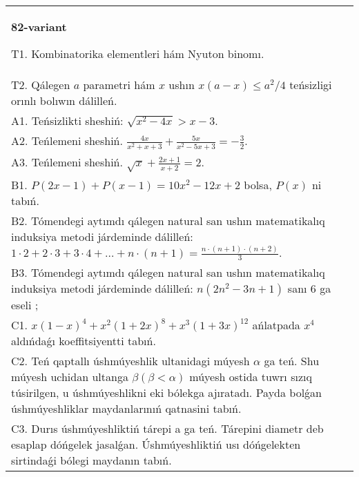 \documentclass{article}
\begin{document}
\begin{tabular}{m{17cm}}
\textbf{82-variant}
\newline

T1. Kombinatorika elementleri hám Nyuton binomı. \\
T2. Qálegen \(a\) parametri hám \(x\) ushın \(x(a - x) \leq a^{2}/4\) teńsizligi orınlı bolıwın dálilleń. \\
A1. Teńsizlikti sheshiń: \(\sqrt{x^{2} - 4x} > x - 3\). \\
A2. Teńlemeni sheshiń. \(\frac{4x}{x^{2} + x + 3} + \frac{5x}{x^{2} - 5x + 3} = - \frac{3}{2}\). \\
A3. Teńlemeni sheshiń. \(\sqrt{x} + \frac{2x + 1}{x + 2} = 2\). \\
B1. \(P(2x - 1) + P(x - 1) = 10x^{2} - 12x + 2\) bolsa, \(P(x)\) ni tabıń. \\
B2. Tómendegi aytımdı qálegen natural san ushın matematikalıq induksiya metodi járdeminde dálilleń: \(1 \cdot 2 + 2 \cdot 3 + 3 \cdot 4 + \ldots + n \cdot (n + 1) = \frac{n \cdot (n + 1) \cdot (n + 2)}{3}\). \\
B3. Tómendegi aytımdı qálegen natural san ushın matematikalıq induksiya metodi járdeminde dálilleń: \(n\left( 2n^{2} - 3n + 1 \right)\) sanı 6 ga eseli ; \\
C1. \(x(1 - x)^{4} + x^{2}(1 + 2x)^{8} + x^{3}(1 + 3x)^{12}\) ańlatpada \(x^{4}\) aldıńdaǵı koeffitsiyentti tabıń. \\
C2. Teń qaptallı úshmúyeshlik ultanidagi múyesh \(\alpha\) ga teń. Shu múyesh uchidan ultanga \(\beta(\beta < \alpha)\) múyesh ostida tuwrı sızıq túsirilgen, u úshmúyeshlikni eki bólekga ajıratadı. Payda bolǵan úshmúyeshliklar maydanlarınıń qatnasini tabıń. \\
C3. Durıs úshmúyeshliktiń tárepi a ga teń. Tárepini diametr deb esaplap dóńgelek jasalǵan. Úshmúyeshliktiń usı dóńgelekten sirtindaǵi bólegi maydanın tabıń. \\

\end{tabular}
\vspace{1cm}
\end{document}
